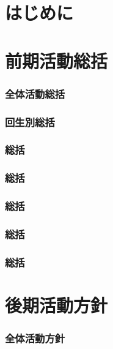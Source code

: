 \part*{はじめに}


\newpage
\part{前期活動総括}
\section{全体活動総括}


\section{回生別総括}





\section{\kaikeiDepartment{}総括}

\section{\kensuiDepartment{}総括}

\section{\syogaiDepartment{}総括}

\section{\systemDepartment{}総括}

\section{\soumuDepartment{}総括}


\newpage
\part{後期活動方針}
\section{全体活動方針}


